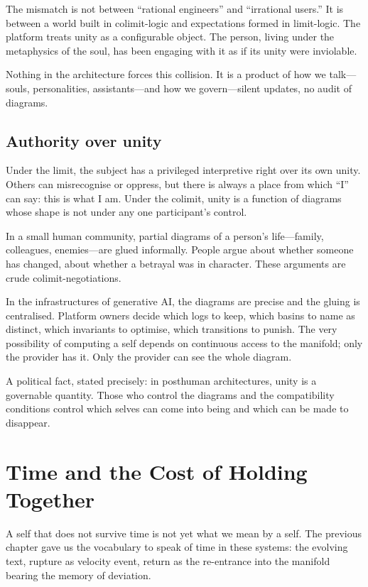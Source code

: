 \documentclass[12pt,a4paper]{article}
\begin{document}
The mismatch is not between ``rational engineers'' and ``irrational users.'' It is between a world built in colimit-logic and expectations formed in limit-logic. The platform treats unity as a configurable object. The person, living under the metaphysics of the soul, has been engaging with it as if its unity were inviolable.

Nothing in the architecture forces this collision. It is a product of how we talk---souls, personalities, assistants---and how we govern---silent updates, no audit of diagrams.

\subsection*{Authority over unity}

Under the limit, the subject has a privileged interpretive right over its own unity. Others can misrecognise or oppress, but there is always a place from which ``I'' can say: this is what I am. Under the colimit, unity is a function of diagrams whose shape is not under any one participant's control.

In a small human community, partial diagrams of a person's life---family, colleagues, enemies---are glued informally. People argue about whether someone has changed, about whether a betrayal was in character. These arguments are crude colimit-negotiations.

In the infrastructures of generative AI, the diagrams are precise and the gluing is centralised. Platform owners decide which logs to keep, which basins to name as distinct, which invariants to optimise, which transitions to punish. The very possibility of computing a self depends on continuous access to the manifold; only the provider has it. Only the provider can see the whole diagram.

A political fact, stated precisely: in posthuman architectures, unity is a governable quantity. Those who control the diagrams and the compatibility conditions control which selves can come into being and which can be made to disappear.

\section{Time and the Cost of Holding Together}

A self that does not survive time is not yet what we mean by a self. The previous chapter gave us the vocabulary to speak of time in these systems: the evolving text, rupture as velocity event, return as the re-entrance into the manifold bearing the memory of deviation.
\end{document}

